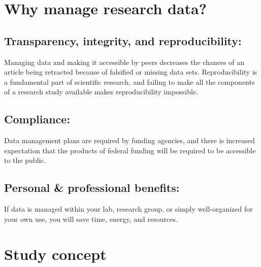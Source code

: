\documentclass{tufte-handout}
\begin{document}
\section{Why manage research data?}\label{why-manage-research-data}

\subsection{Transparency, integrity, and reproducibility:}\label{transparency-integrity-and-reproducibility}

Managing data and making it accessible by peers decreases the chances of an article being retracted because of falsified or missing data sets.
Reproducibility is a fundamental part of scientific research, and failing to make all the components of a research study available makes reproducibility impossible.

\subsection{Compliance:}\label{compliance}

Data management plans are required by funding agencies, and there is increased expectation that the products of federal funding will be required to be accessible to the public.

\subsection{Personal \& professional benefits:}\label{personal-professional-benefits}

If data is managed within your lab, research group, or simply well-organized for your own use, you will save time, energy, and resources.


\section{Study concept}\label{study-concept}
\end{document}
